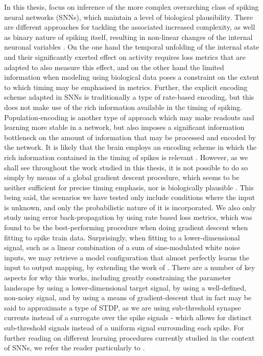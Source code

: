 \documentclass[mphil,deptreport,ianc]{infthesis} %
\begin{document}
In this thesis, focus on inference of the more complex overarching class of spiking neural networks (SNNs), which maintain a level of biological plausibility.
There are different approaches for tackling the associated increased complexity, as well as binary nature of spiking itself, resulting in non-linear changes of the internal neuronal variables \cite{Jang, Taherkhani2020, Thalmeier2016, Tavanaei2019a, Bellec2019a, Neftci2019, Bohte2002, Nicola2017, Tavanaei2019, Mostafa2018, Goncalves2019}.
On the one hand the temporal unfolding of the internal state and their significantly exerted effect on activity requires loss metrics that are adapted to also measure this effect, and on the other hand the limited information when modeling using biological data poses a constraint on the extent to which timing may be emphasised in metrics.
Further, the explicit encoding scheme adapted in SNNs is traditionally a type of rate-based encoding, but this does not make use of the rich information available in the timing of spiking.
Population-encoding \cite{Rene2020} is another type of approach which may make readouts and learning more stable in a network, but also imposes a significant information bottleneck on the amount of information that may be processed and encoded by the network.
It is likely that the brain employs an encoding scheme in which the rich information contained in the timing of spikes is relevant \cite{Buzsaki2006}. 
However, as we shall see throughout the work studied in this thesis, it is not possible to do so simply by means of a global gradient descent procedure, which seems to be neither sufficient for precise timing emphasis, nor is biologically plausible \cite{Houghton2008, VanRossum2001, GrunSonjaRotter2010}.
This being said, the scenarios we have tested only include conditions where the input is unknown, and only the probabilistic nature of it is incorporated.
We also only study using error back-propagation by using rate based loss metrics, which was found to be the best-performing procedure when doing gradient descent when fitting to spike train data.
Surprisingly, when fitting to a lower-dimensional signal, such as a linear combination of a sum of sine-modulated white noise inputs, we may retrieve a model configuration that almost perfectly learns the input to output mapping, by extending the work of \cite{Huh2017}.
There are a number of key aspects for why this works, including greatly constraining the parameter landscape by using a lower-dimensional target signal, by using a well-defined, non-noisy signal, and by using a means of gradient-descent that in fact may be said to approximate a type of STDP, as we are using sub-threshold synapse currents instead of a surrogate over the spike signals - which allows for distinct sub-threshold signals instead of a uniform signal surrounding each spike.
For further reading on different learning procedures currently studied in the context of SNNs, we refer the reader particularly to \cite{Taherkhani2020}.
\end{document}
